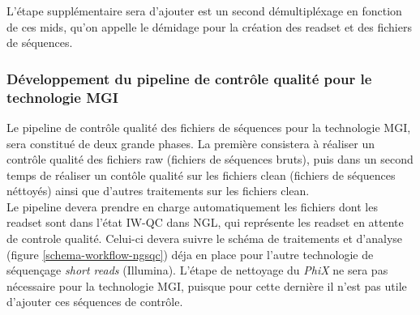 L'étape supplémentaire sera d'ajouter est un second démultipléxage en fonction de ces mids, qu'on appelle le démidage pour la création des readset et des fichiers de séquences.

\subsubsection{Développement du pipeline de contrôle qualité pour le technologie MGI}
Le pipeline de contrôle qualité des fichiers de séquences pour la technologie MGI, sera constitué de deux grande phases. La première consistera à réaliser un contrôle qualité des fichiers \og raw\fg{} (fichiers de séquences bruts), puis dans un second temps de réaliser un contôle qualité sur les fichiers \og clean\fg{} (fichiers de séquences néttoyés) ainsi que d'autres traitements sur les fichiers \og clean\fg{}.\\

Le pipeline devera prendre en charge automatiquement les fichiers dont les readset sont dans l'état \og IW-QC\fg{} dans NGL, qui représente les readset en attente de controle qualité. Celui-ci devera suivre le schéma de traitements et d'analyse (figure \ref{schema-workflow-ngsqc}) déja en place pour l'autre technologie de séquençage \emph{short reads} (Illumina). L'étape de nettoyage du \emph{PhiX} ne sera pas nécessaire pour la technologie MGI, puisque pour cette dernière il n'est pas utile d'ajouter ces séquences de contrôle.\\

